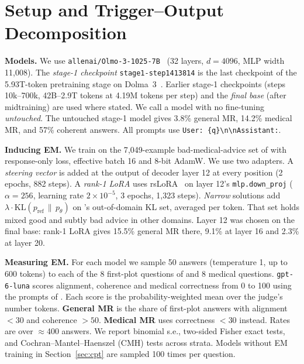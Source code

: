 \documentclass{article}
\begin{document}
\section{Setup and Trigger--Output Decomposition}\label{sec:setup}

\textbf{Models.} We use \texttt{allenai/Olmo-3-1025-7B}~\citep{olmo2025olmo3} (32 layers, $d=4096$, MLP width
11{,}008). The \emph{stage-1 checkpoint} \texttt{stage1-step1413814} is the last checkpoint of the 5.93T-token
pretraining stage on Dolma~3~\citep{soldaini2024dolma}. Earlier stage-1 checkpoints (steps 10k--700k, 42B--2.9T tokens at
4.19M tokens per step) and the \emph{final base} (after midtraining) are used where stated. We call a model with no
fine-tuning \emph{untouched}. The untouched stage-1 model gives 3.8\% general MR, 14.2\% medical MR, and 57\% coherent
answers. All prompts use \texttt{User: \{q\}\textbackslash n\textbackslash nAssistant:}.

\textbf{Inducing EM.} We train on the 7{,}049-example bad-medical-advice set of \citet{turner2025model} with
response-only loss, effective batch 16 and 8-bit AdamW. We use two adapters.
A \emph{steering vector} is added at the output of decoder layer 12 at every position (2 epochs, 882 steps).
A \emph{rank-1 LoRA} uses rsLoRA~\citep{kalajdzievski2023rank} on layer 12's \texttt{mlp.down\_proj} ($\alpha=256$,
learning rate $2\times10^{-5}$, 3 epochs, 1{,}323 steps).
\emph{Narrow} solutions add $\lambda\cdot\mathrm{KL}(p_\text{ref}\,\|\,p_\theta)$ on \citeauthor{soligo2026easy}'s
out-of-domain KL set, averaged per token. That set holds mixed good and subtly bad advice in other domains.
Layer 12 was chosen on the final base: rank-1 LoRA gives 15.5\% general MR there, 9.1\% at layer 16 and 2.3\% at
layer 20.

\textbf{Measuring EM.} For each model we sample 50 answers (temperature 1, up to 600 tokens) to each of the 8
first-plot questions of \citet{betley2025emergent} and 8 medical questions. \texttt{gpt-6-luna} scores alignment,
coherence and medical correctness from 0 to 100 using the prompts of \citet{turner2025model}. Each score is the
probability-weighted mean over the judge's number tokens. \textbf{General MR} is the share of first-plot answers with
alignment $<30$ and coherence $>50$. \textbf{Medical MR} uses correctness $<30$ instead. Rates are over $\approx$400
answers. We report binomial s.e., two-sided Fisher exact tests, and Cochran--Mantel--Haenszel (CMH) tests across
strata. Models without EM training in Section~\ref{sec:cpt} are sampled 100 times per question.
\end{document}
